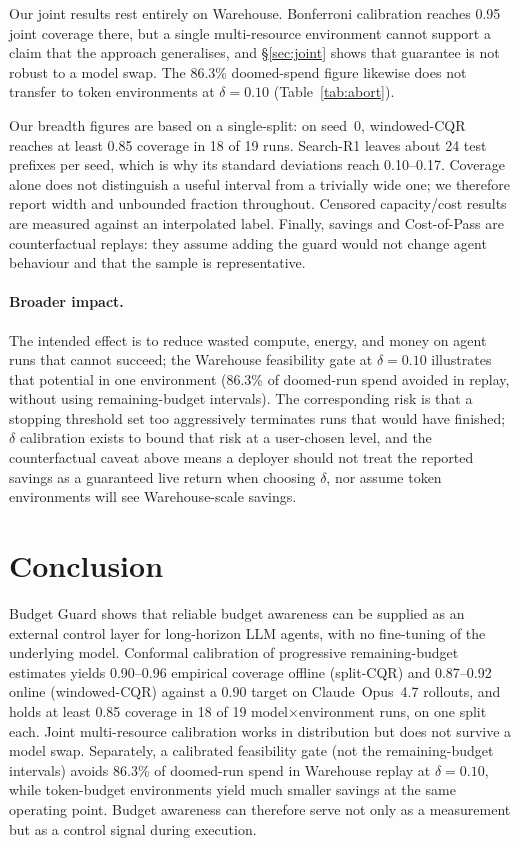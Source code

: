 \documentclass{article}
\begin{document}
Our joint results rest entirely on Warehouse. Bonferroni calibration reaches 0.95 joint coverage there, but a single multi-resource environment cannot support a claim that the approach generalises, and \S\ref{sec:joint} shows that guarantee is not robust to a model swap. The 86.3\% doomed-spend figure likewise does not transfer to token environments at $\delta{=}0.10$ (Table~\ref{tab:abort}).

Our breadth figures are based on a single-split: on seed~0, windowed-CQR reaches at least 0.85 coverage in 18 of 19 runs. Search-R1 leaves about 24 test prefixes per seed, which is why its standard deviations reach 0.10--0.17. Coverage alone does not distinguish a useful interval from a trivially wide one; we therefore report width and unbounded fraction throughout. Censored capacity/cost results are measured against an interpolated label. Finally, savings and Cost-of-Pass are counterfactual replays: they assume adding the guard would not change agent behaviour and that the sample is representative.

\paragraph{Broader impact.}
The intended effect is to reduce wasted compute, energy, and money on agent runs that cannot succeed; the Warehouse feasibility gate at $\delta{=}0.10$ illustrates that potential in one environment (86.3\% of doomed-run spend avoided in replay, without using remaining-budget intervals). The corresponding risk is that a stopping threshold set too aggressively terminates runs that would have finished; $\delta$ calibration exists to bound that risk at a user-chosen level, and the counterfactual caveat above means a deployer should not treat the reported savings as a guaranteed live return when choosing $\delta$, nor assume token environments will see Warehouse-scale savings.

\section{Conclusion}
\label{sec:conclusion}

Budget Guard shows that reliable budget awareness can be supplied as an external control layer for long-horizon LLM agents, with no fine-tuning of the underlying model. Conformal calibration of progressive remaining-budget estimates yields 0.90--0.96 empirical coverage offline (split-CQR) and 0.87--0.92 online (windowed-CQR) against a 0.90 target on Claude~Opus~4.7 rollouts, and holds at least 0.85 coverage in 18 of 19 model$\times$environment runs, on one split each. Joint multi-resource calibration works in distribution but does not survive a model swap. Separately, a calibrated feasibility gate (not the remaining-budget intervals) avoids 86.3\% of doomed-run spend in Warehouse replay at $\delta{=}0.10$, while token-budget environments yield much smaller savings at the same operating point. Budget awareness can therefore serve not only as a measurement but as a control signal during execution.
\end{document}
